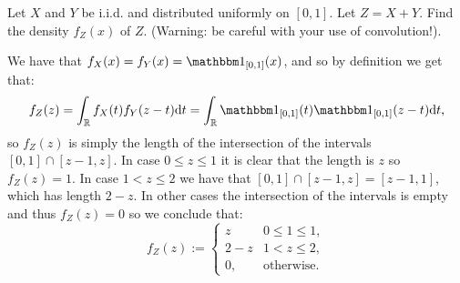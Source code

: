 \documentclass[11pt,a4paper]{article}
\begin{document}
\begin{exercise}
  Let $X$ and $Y$ be i.i.d. and distributed uniformly on $[0,1]$.
  Let $Z = X + Y$.
  Find the density $f_Z(x)$ of $Z$.
  (Warning: be careful with your use of convolution!).
\end{exercise}
\begin{solution}
  We have that $f_X(x) = f_Y(x) = \ind_{[0,1]}(x)$,
  and so by definition we get that:
  \[
    f_Z(z) =
    \int_{\R} f_X(t) f_Y(z - t) \dt =
    \int_{\R} \ind_{[0,1]}(t) \ind_{[0,1]}(z - t) \dt,
  \]
  so $f_Z(z)$ is simply the length of the intersection of
  the intervals $[0,1] \cap [z - 1,z]$.
  In case $0 \le z \le 1$ it is clear that the length is $z$
  so $f_Z(z) = 1$.
  In case $1 < z \le 2$ we have that
  $[0,1] \cap [z - 1, z] = [z - 1, 1]$, which has length $2 - z$.
  In other cases the intersection of the intervals is empty and thus
  $f_Z(z) = 0$ so we conclude that:
  \[
    f_Z(z) :=
    \begin{cases}
      z &0 \le 1 \le 1, \\
      2 - z &1 < z \le 2, \\
      0, &\text{otherwise}.
    \end{cases}
  \]
\end{solution}
\end{document}
